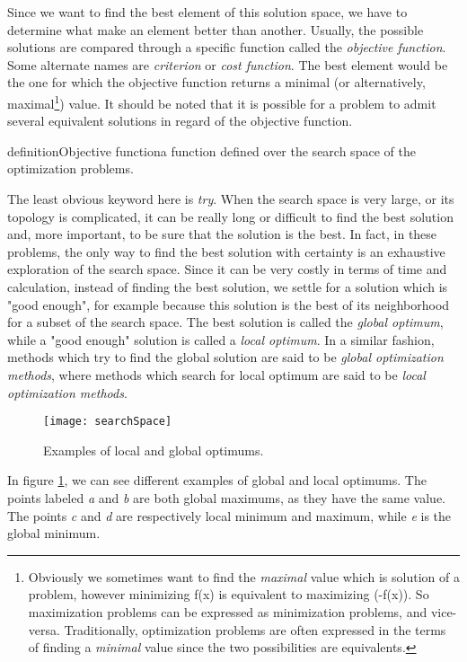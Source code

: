 Since we want to find the best element of this solution space, we have to determine what make an element better than another. Usually, the possible solutions are compared through a specific function called the \emph{objective function}. Some alternate names are \emph{criterion} or \emph{cost function}. The best element would be the one for which the objective function returns a minimal (or alternatively, maximal\footnote{Obviously we sometimes want to find the \emph{maximal} value which is solution of a problem, however minimizing f(x) is equivalent to maximizing (-f(x)). So maximization problems can be expressed as minimization problems, and vice-versa. Traditionally, optimization problems are often expressed in the terms of finding a \emph{minimal} value since the two possibilities are equivalents.}) value. It should be noted that it is possible for a problem to admit several equivalent solutions in regard of the objective function.

definition{Objective function}{a function defined over the search space of the optimization problems.}

The least obvious keyword here is \emph{try}. When the search space is very large, or its topology is complicated, it can be really long or difficult to find the best solution and, more important, to be sure that the solution is the best. In fact, in these problems, the only way to find the best solution with certainty is an exhaustive exploration of the search space. Since it can be very costly in terms
of time and calculation, instead of finding the best solution, we settle for a solution which is "good enough", for example because this solution is the best of its neighborhood for a subset of the search space. The best solution is called the \emph{global optimum}, while a "good enough" solution is called a \emph{local optimum}. In a similar fashion, methods which try to find the global solution are said to be \emph{global optimization methods}, where methods which search for local optimum are said to be \emph{local optimization methods}.


\begin{figure}
\centering
\texttt{[image: searchSpace]}
\caption{Examples of local and global optimums.}
\label{localAndGlobalOptims}
\end{figure}

In figure \ref{localAndGlobalOptims}, we can see different examples of global and local optimums. The points labeled \emph{a} and \emph{b} are both global maximums, as they have the same value. The points
\emph{c} and \emph{d} are respectively local minimum and maximum, while \emph{e} is the global minimum.

